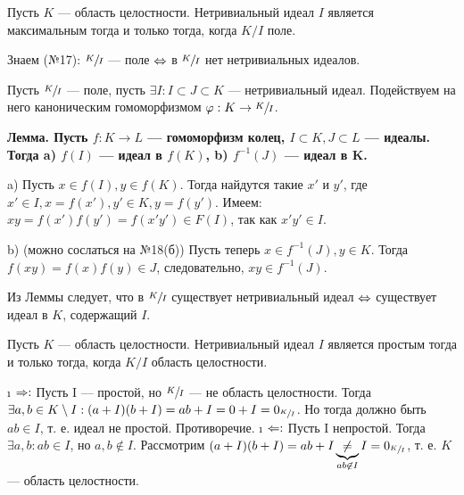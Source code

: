 \begin{problem}
Пусть $K$ --- область целостности. Нетривиальный идеал $I$ является максимальным тогда и только тогда, когда $K/I$ поле.
\end{problem}

\begin{solution}
Знаем (№17): \(\sfrac{K}{I}\) --- поле \(\Leftrightarrow\) в \(\sfrac{K}{I}\) нет нетривиальных идеалов.

Пусть \(\sfrac{K}{I}\) --- поле, пусть \(\exists I: I \subset J \subset K\) --- нетривиальный идеал. Подействуем на него каноническим гомоморфизмом \(\varphi: K \to \sfrac{K}{I}\).

\bf{Лемма.} Пусть \(f: K \to L\) --- гомоморфизм колец, \(I \subset K, J \subset L\) --- идеалы. Тогда a) \(f(I)\) --- идеал в \(f (K)\), b) \(f^{-1} (J)\) --- идеал в K.

\begin{solution}
a) Пусть $x \in f(I), y \in f(K)$. Тогда найдутся такие $x'$ и $y'$, где $x' \in I, x = f(x'), y' \in K, y = f(y')$.
    Имеем: $xy = f(x')f(y') = f (x' y') \in F(I)$, так как $x' y' \in I$.
    
b) (можно сослаться на №18(б)) Пусть теперь $x \in f^{-1}(J), y \in K$. Тогда $f(xy) = f(x)f(y) \in J$, следовательно, $xy \in f^{-1}(J)$.
\end{solution}

Из Леммы следует, что в \(\sfrac{K}{I}\) существует нетривиальный идеал \(\Leftrightarrow\) существует идеал в \(K\), содержащий \(I\).

\end{solution}

\begin{problem}[22(4.7)]
Пусть $K$ --- область целостности. Нетривиальный идеал $I$ является простым тогда и только тогда, когда $K/I$ область целостности.
\end{problem}

\begin{solution}

\begin{itemize}
\tightlist
\i
  \(\Rightarrow:\)
  Пусть I --- простой, но \(\sfrac{K}{I}\) --- не область целостности. Тогда \(\exists a, b \in K\setminus I: (a+I)(b+I) = ab+I = 0+I = 0_{\sfrac{K}{I}}\). Но тогда должно быть \(ab \in I\), т. е. идеал не простой. Противоречие.
\i
  \(\Leftarrow:\)
  Пусть I непростой. Тогда \(\exists a, b: ab \in I\), но \(a, b \not\in I\). Рассмотрим \((a+I)(b+I) = ab + I \underbrace{\ne}_{ab \not\in I} I = 0_{\sfrac{K}{I}}\), т. е. $K$ --- область целостности.
\end{itemize}

\end{solution}


